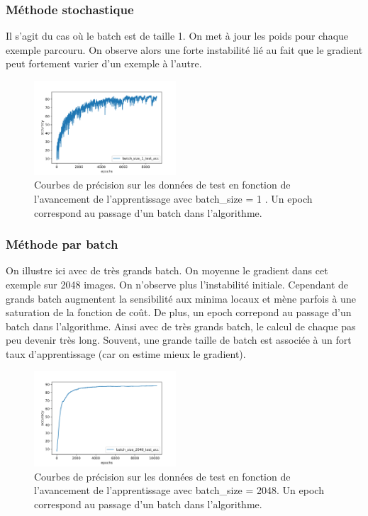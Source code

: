 \subsubsection{Méthode stochastique}
Il s'agit du cas où le batch est de taille 1. On met à jour les poids pour chaque exemple parcouru. On observe alors une forte instabilité lié au fait que le gradient peut fortement varier d'un exemple à l'autre.
\begin{figure}[!h]
\centering
\includegraphics[width=150pt]{"images/MLP/batch1"}
\caption{Courbes de précision sur les données de test en fonction de l'avancement de l'apprentissage avec batch\_size = 1 . Un epoch correspond au passage d'un batch dans l'algorithme. }
\label{batch1}
\end{figure}


\subsubsection{Méthode par batch}
On illustre ici avec de très grands batch. On moyenne le gradient dans cet exemple sur 2048 images. On n'observe plus l'instabilité initiale. Cependant de grands batch augmentent la sensibilité aux minima locaux et mène parfois à une saturation de la fonction de coût. De plus, un epoch correpond au passage d'un batch dans l'algorithme. Ainsi avec de très grands batch, le calcul de chaque pas peu devenir très long. Souvent, une grande taille de batch est associée à un fort taux d'apprentissage (car on estime mieux le gradient).
\begin{figure}[!h]
\centering
\includegraphics[width=150pt]{"images/MLP/batch2048"}
\caption{Courbes de précision sur les données de test en fonction de l'avancement de l'apprentissage avec batch\_size = 2048. Un epoch correspond au passage d'un batch dans l'algorithme. }
\label{batch1}
\end{figure}

